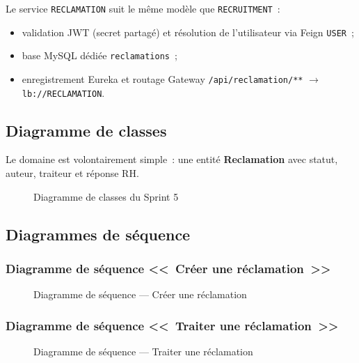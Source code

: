 Le service \texttt{RECLAMATION} suit le même modèle que
\texttt{RECRUITMENT}~:
\begin{itemize}
  \item validation JWT (secret partagé) et résolution de l'utilisateur via
        Feign \texttt{USER}~;
  \item base MySQL dédiée \texttt{reclamations}~;
  \item enregistrement Eureka et routage Gateway
        \texttt{/api/reclamation/**} $\rightarrow$ \texttt{lb://RECLAMATION}.
\end{itemize}

\subsection{Diagramme de classes}

Le domaine est volontairement simple~: une entité \textbf{Reclamation}
avec statut, auteur, traiteur et réponse RH.

\begin{figure}[H]
  \centering
  \caption{Diagramme de classes du Sprint 5}
  \label{fig:class-sprint5}
\end{figure}


\subsection{Diagrammes de séquence}

\subsubsection{Diagramme de séquence <<~Créer une réclamation~>>}

\begin{figure}[H]
  \centering
  \caption{Diagramme de séquence --- Créer une réclamation}
  \label{fig:seq-create-reclamation}
\end{figure}

\subsubsection{Diagramme de séquence <<~Traiter une réclamation~>>}

\begin{figure}[H]
  \centering
  \caption{Diagramme de séquence --- Traiter une réclamation}
  \label{fig:seq-process-reclamation}
\end{figure}


